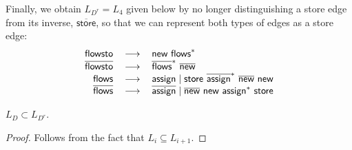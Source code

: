 \documentclass[sigplan,10pt,review,anonymous]{acmart}
\newcommand{\reg}[1]{\textsf{#1}\xspace}
\newcommand{\invreg}[1]{\overline{\reg{#1}}\xspace}
\newcommand{\flowsto}{\reg{flowsto}}
\newcommand{\iflowsto}{\invreg{flowsto}}
\newcommand{\flows}{\reg{flows}}
\newcommand{\iflows}{\invreg{flows}}
\newcommand{\new}{\reg{new}}
\newcommand{\inew}{\invreg{new}}
\newcommand{\assign}{\reg{assign}}
\newcommand{\iassign}{\invreg{assign}}
\newcommand{\store}{\reg{store}}
\newcommand{\istore}{\invreg{store}}
\newcommand{\LF}{\mbox{$L_D$}\xspace}
\newcommand{\LG}{\mbox{$L_{D^r}$}\xspace}
\begin{document}
Finally, we obtain $\LG=L_4$ given below by
no longer distinguishing a \store edge from its inverse, $\istore$, so that we can
represent both types of edges as a \store edge:\\
\begin{equation}
\label{eqn:newLr}
\begin{tabular}{rcl} 
$\flowsto$ &  $\longrightarrow$ & $\new ~ \flows^*$ \\
$\iflowsto$ & $\longrightarrow$ & $\iflows^* ~ \inew$ \\
$\flows$ & $\longrightarrow$ & $\assign \mid  \store \ \iassign^* ~ \inew\ \new$ \\
$\iflows$ & $\longrightarrow$ & $\iassign \mid \inew \ \new ~ \assign^* \ \store$ 
\end{tabular}
\end{equation}

\begin{lemma}
    \label{thm:LRsubsumeLF}
    $\LF \subset \LG$.
\end{lemma}
\begin{proof}
    Follows  from the fact that $L_i \subseteq L_{i+1}$. 
\end{proof}

% 

%
\end{document}
